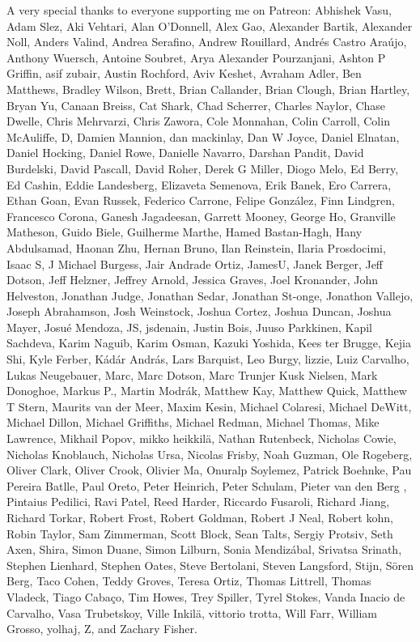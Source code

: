 \documentclass[]{article}
\begin{document}
A very special thanks to everyone supporting me on Patreon: Abhishek
Vasu, Adam Slez, Aki Vehtari, Alan O'Donnell, Alex Gao, Alexander
Bartik, Alexander Noll, Anders Valind, Andrea Serafino, Andrew
Rouillard, Andrés Castro Araújo, Anthony Wuersch, Antoine Soubret, Arya
Alexander Pourzanjani, Ashton P Griffin, asif zubair, Austin Rochford,
Aviv Keshet, Avraham Adler, Ben Matthews, Bradley Wilson, Brett, Brian
Callander, Brian Clough, Brian Hartley, Bryan Yu, Canaan Breiss, Cat
Shark, Chad Scherrer, Charles Naylor, Chase Dwelle, Chris Mehrvarzi,
Chris Zawora, Cole Monnahan, Colin Carroll, Colin McAuliffe, D, Damien
Mannion, dan mackinlay, Dan W Joyce, Daniel Elnatan, Daniel Hocking,
Daniel Rowe, Danielle Navarro, Darshan Pandit, David Burdelski, David
Pascall, David Roher, Derek G Miller, Diogo Melo, Ed Berry, Ed Cashin,
Eddie Landesberg, Elizaveta Semenova, Erik Banek, Ero Carrera, Ethan
Goan, Evan Russek, Federico Carrone, Felipe González, Finn Lindgren,
Francesco Corona, Ganesh Jagadeesan, Garrett Mooney, George Ho,
Granville Matheson, Guido Biele, Guilherme Marthe, Hamed Bastan-Hagh,
Hany Abdulsamad, Haonan Zhu, Hernan Bruno, Ilan Reinstein, Ilaria
Prosdocimi, Isaac S, J Michael Burgess, Jair Andrade Ortiz, JamesU,
Janek Berger, Jeff Dotson, Jeff Helzner, Jeffrey Arnold, Jessica Graves,
Joel Kronander, John Helveston, Jonathan Judge, Jonathan Sedar, Jonathan
St-onge, Jonathon Vallejo, Joseph Abrahamson, Josh Weinstock, Joshua
Cortez, Joshua Duncan, Joshua Mayer, Josué Mendoza, JS, jsdenain, Justin
Bois, Juuso Parkkinen, Kapil Sachdeva, Karim Naguib, Karim Osman, Kazuki
Yoshida, Kees ter Brugge, Kejia Shi, Kyle Ferber, Kádár András, Lars
Barquist, Leo Burgy, lizzie, Luiz Carvalho, Lukas Neugebauer, Marc, Marc
Dotson, Marc Trunjer Kusk Nielsen, Mark Donoghoe, Markus P., Martin
Modrák, Matthew Kay, Matthew Quick, Matthew T Stern, Maurits van der
Meer, Maxim Kesin, Michael Colaresi, Michael DeWitt, Michael Dillon,
Michael Griffiths, Michael Redman, Michael Thomas, Mike Lawrence,
Mikhail Popov, mikko heikkilä, Nathan Rutenbeck, Nicholas Cowie,
Nicholas Knoblauch, Nicholas Ursa, Nicolas Frisby, Noah Guzman, Ole
Rogeberg, Oliver Clark, Oliver Crook, Olivier Ma, Onuralp Soylemez,
Patrick Boehnke, Pau Pereira Batlle, Paul Oreto, Peter Heinrich, Peter
Schulam, Pieter van den Berg , Pintaius Pedilici, Ravi Patel, Reed
Harder, Riccardo Fusaroli, Richard Jiang, Richard Torkar, Robert Frost,
Robert Goldman, Robert J Neal, Robert kohn, Robin Taylor, Sam Zimmerman,
Scott Block, Sean Talts, Sergiy Protsiv, Seth Axen, Shira, Simon Duane,
Simon Lilburn, Sonia Mendizábal, Srivatsa Srinath, Stephen Lienhard,
Stephen Oates, Steve Bertolani, Steven Langsford, Stijn, Sören Berg,
Taco Cohen, Teddy Groves, Teresa Ortiz, Thomas Littrell, Thomas Vladeck,
Tiago Cabaço, Tim Howes, Trey Spiller, Tyrel Stokes, Vanda Inacio de
Carvalho, Vasa Trubetskoy, Ville Inkilä, vittorio trotta, Will Farr,
William Grosso, yolhaj, Z, and Zachary Fisher.
\end{document}
